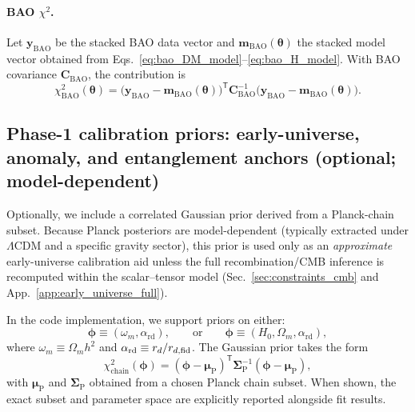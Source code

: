 \documentclass[10pt]{article}
\begin{document}
\paragraph{BAO $\chi^2$.}
Let $\bm{y}_{\mathrm{BAO}}$ be the stacked BAO data vector and $\bm{m}_{\mathrm{BAO}}(\bm{\theta})$ the stacked model vector obtained from Eqs.~\eqref{eq:bao_DM_model}--\eqref{eq:bao_H_model}. With BAO covariance $\bm{C}_{\mathrm{BAO}}$, the contribution is
\begin{equation}
\chi^2_{\mathrm{BAO}}(\bm{\theta}) =
\bigl(\bm{y}_{\mathrm{BAO}}-\bm{m}_{\mathrm{BAO}}(\bm{\theta})\bigr)^{\mathsf{T}}
\bm{C}_{\mathrm{BAO}}^{-1}
\bigl(\bm{y}_{\mathrm{BAO}}-\bm{m}_{\mathrm{BAO}}(\bm{\theta})\bigr).
\end{equation}

\subsection{Phase-1 calibration priors: early-universe, anomaly, and entanglement anchors (optional; model-dependent)}
\label{sec:planck_prior}

Optionally, we include a correlated Gaussian prior derived from a Planck-chain subset.
Because Planck posteriors are model-dependent (typically extracted under \(\Lambda\)CDM and a specific
gravity sector), this prior is used only as an \emph{approximate} early-universe calibration aid
unless the full recombination/CMB inference is recomputed within the scalar--tensor model
(Sec.~\ref{sec:constraints_cmb} and App.~\ref{app:early_universe_full}).

In the code implementation, we support priors on either:
\begin{equation}
\bm{\phi} \equiv (\omega_m,\alpha_{\mathrm{rd}}),
\qquad
\text{or}\qquad
\bm{\phi}\equiv(H_0,\Omega_m,\alpha_{\mathrm{rd}}),
\end{equation}
where \(\omega_m\equiv \Omega_m h^2\) and \(\alpha_{\rm rd}\equiv r_d/r_{d,\rm fid}\).
The Gaussian prior takes the form
\begin{equation}
\chi^2_{\mathrm{chain}}(\bm{\phi})
= (\bm{\phi}-\bm{\mu}_{\mathrm{P}})^{\mathsf{T}}
\bm{\Sigma}_{\mathrm{P}}^{-1}
(\bm{\phi}-\bm{\mu}_{\mathrm{P}}),
\end{equation}
with \(\bm{\mu}_{\mathrm{P}}\) and \(\bm{\Sigma}_{\mathrm{P}}\) obtained from a chosen Planck chain subset.
When shown, the exact subset and parameter space are explicitly reported alongside fit results.
\end{document}
